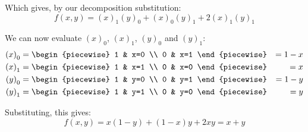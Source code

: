 \begin{example}
    Which gives, by our decomposition substitution:
    $$
        f(x,y)={(x)}_{1}{(y)}_{0}+{(x)}_{0}{(y)}_{1}+2{(x)}_{1}{(y)}_{1}
    $$

    We can now evaluate ${(x)}_0$, ${(x)}_1$, ${(y)}_0$ and ${(y)}_1$:
    \begin{align*}
        {(x)}_0 &= \begin{piecewise}
            1 & x=0 \\
            0 & x=1
        \end{piecewise} &= 1-x \\
        {(x)}_1 &= \begin{piecewise}
            1 & x=1 \\
            0 & x=0
        \end{piecewise} &= x \\
        {(y)}_0 &= \begin{piecewise}
            1 & y=0 \\
            0 & y=1
        \end{piecewise} &= 1-y \\
        {(y)}_1 &= \begin{piecewise}
            1 & y=1 \\
            0 & y=0
        \end{piecewise} &= y \\
    \end{align*}

    Substituting, this gives:
    $$
        f(x,y)=x(1-y)+(1-x)y+2xy=x+y
    $$
\end{example}
\newpage